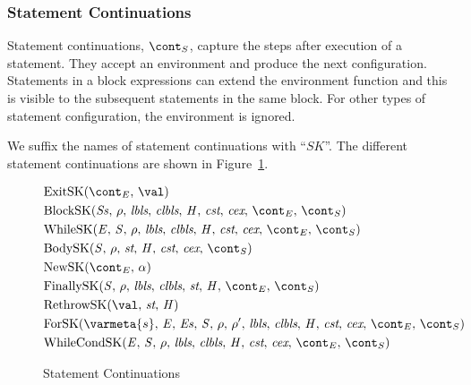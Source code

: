 \documentclass[a4paper,oneside,fleqn]{article}
\begin{document}
\subsubsection{Statement Continuations}
\label{subsubsec:statement-continuations}

Statement continuations, $\scont$, capture the steps after execution of a statement.
They accept an environment and produce the next configuration.
Statements in a block expressions can extend the environment function and this is visible to the subsequent statements in the same block.
For other types of statement configuration, the environment is ignored.

We suffix the names of statement continuations with ``$SK$''.
The different statement continuations are shown in Figure~\ref{figure:sconts}.

\newcommand{\ExitSK}[1]{\mathrm{ExitSK}(\econt,\,#1)}
\newcommand{\BlockSK}[2]{\mathrm{BlockSK}({#1},\,{#2},\,\lbls,\,\clbls,\,\handler,\,\cstrace,\,\cex,\,\econt,\,\scont)}
\newcommand{\WhileSK}{\mathrm{WhileSK}(\expr,\,\stmt,\,\env,\,\lbls,\,\clbls,\,\handler,\,\cstrace,\,\cex,\,\econt,\,\scont)}
\newcommand{\BodySK}[3]{\mathrm{BodySK}({#1},\,{#2},\,\strace,\,\handler,\,\cstrace,\,\cex,\,{#3})}
\newcommand{\NewSK}[2]{\mathrm{NewSK}({#1},\,{#2})}
\newcommand{\FinallySK}[1]{\mathrm{FinallySK}({#1},\,\env,\,\lbls,\,\clbls,\,\strace,\,\handler,\,\econt,\,\scont)}
\newcommand{\RethrowSK}[3]{\mathrm{RethrowSK}({#1},\,{#2},\,{#3})}
\newcommand{\ForSK}{\mathrm{ForSK}(\varmeta{s},\, \expressionmeta,\, \exprs,\, \statementmeta,\, \env,\, \env',\, \lbls,\, \clbls,\, \handler,\, \cstrace,\, \cex,\, \econt,\, \scont)}
\newcommand{\WhileCondSK}{\mathrm{WhileCondSK}(\expr,\,\stmt,\,\env,\,\lbls,\,\clbls,\,\handler,\,\cstrace,\,\cex,\,\econt,\,\scont)}
\begin{figure}[Htp]
  \begin{eqfigure}
  \begin{align}
    &\ExitSK{\val} \label{scont:exit}\\
    &\BlockSK{\stmts}{\env} \label{scont:block}\\
    &\WhileSK \label{scont:while}\\
    &\BodySK{\stmt}{\env}{\scont} \label{scont:body}\\
    &\NewSK{\econt}{\loc} \label{scont:new}\\
    &\FinallySK{\stmt} \label{scont:finally}\\
    &\RethrowSK{\val}{\strace}{\handler} \label{scont:rethrow}\\
    &\ForSK \label{scont:for}\\
    &\WhileCondSK \label{scont:while}
  \end{align}
  \caption{Statement Continuations}
  \label{figure:sconts}
  \end{eqfigure}
\end{figure}
\end{document}

